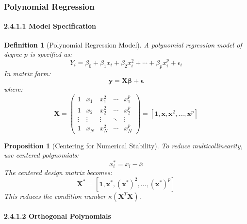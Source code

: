 \documentclass{article}
\newtheorem{definition}{Definition}
\newtheorem{proposition}{Proposition}
\begin{document}
\subsubsection{Polynomial Regression}

\paragraph{2.4.1.1 Model Specification}

\begin{definition}[Polynomial Regression Model]
A polynomial regression model of degree $p$ is specified as:
\begin{equation}
Y_i = \beta_0 + \beta_1 x_i + \beta_2 x_i^2 + \cdots + \beta_p x_i^p + \epsilon_i
\end{equation}
In matrix form:
\begin{equation}
\mathbf{y} = \mathbf{X}\boldsymbol{\beta} + \boldsymbol{\epsilon}
\end{equation}
where:
\begin{equation}
\mathbf{X} = \begin{pmatrix}
1 & x_1 & x_1^2 & \cdots & x_1^p \\
1 & x_2 & x_2^2 & \cdots & x_2^p \\
\vdots & \vdots & \vdots & \ddots & \vdots \\
1 & x_N & x_N^2 & \cdots & x_N^p
\end{pmatrix} = [\mathbf{1}, \mathbf{x}, \mathbf{x}^2, \ldots, \mathbf{x}^p]
\end{equation}
\end{definition}

\begin{proposition}[Centering for Numerical Stability]
To reduce multicollinearity, use centered polynomials:
\begin{equation}
x_i^* = x_i - \bar{x}
\end{equation}
The centered design matrix becomes:
\begin{equation}
\mathbf{X}^* = [\mathbf{1}, \mathbf{x}^*, (\mathbf{x}^*)^2, \ldots, (\mathbf{x}^*)^p]
\end{equation}
This reduces the condition number $\kappa(\mathbf{X}^T\mathbf{X})$.
\end{proposition}

\paragraph{2.4.1.2 Orthogonal Polynomials}
\end{document}
